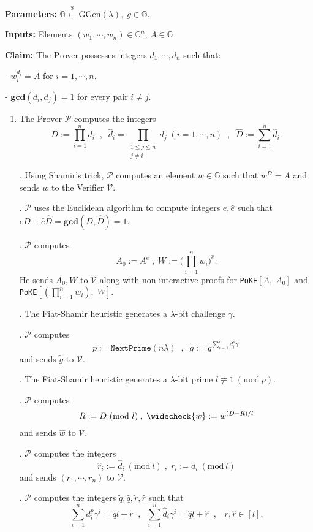 \documentclass[11pt, lettersize, notitlepage, leqno, footskip=0.6cm]{article}
\newcommand{\pl}{\prod\limits}
\newcommand{\slim}{\sum\limits}
\newcommand{\ttt}{\texttt}
\newcommand{\wti}{\widetilde}
\newcommand{\mc}{\mathcal}
\newcommand{\mb}{\mathbb}
\newcommand{\mbf}{\mathbf}
\newcommand{\mr}{\mathrm}
\newcommand{\lam}{\lambda}
\newcommand{\lamb}{\lambda}
\newcommand{\what}{\widehat}
\newcommand{\weck}{\widecheck}
\newcommand{\mP}{\mc{P}}
\newcommand{\V}{\mc{V}}
\newcommand{\vs}{\vspace{-0.15cm}}
\newcommand{\noin}{\noindent}
\newcommand{\Mod}[1]{\ (\mathrm{mod}\ #1)}
\newcommand{\GCD}{\mbf{gcd}}
\numberwithin{equation}{section}
\begin{document}
\noindent \textbf{Parameters:} $\mb{G}\xleftarrow{\$} \mr{GGen}(\lamb), \; g\in \mb{G}$.

\noindent \textbf{Inputs:} Elements $(w_1,\cdots, w_n)\in \mb{G}^n$, $A\in\mb{G}$

\noindent \textbf{Claim:} The Prover possesses integers $ d_1,\cdots, d_n$ such that:

\noindent - $w_i^{d_i} = A$ for $i = 1,\cdots,n$.

\noindent - $\GCD(d_i, d_j) = 1$ for every pair $i\neq j$.

\begin{enumerate}[wide, labelwidth=!, labelindent=0pt]\vs \item The Prover $\mc{P}$ computes the integers \vs $$D := \prod\limits_{i=1}^n d_i\;\;,\;\;\what{d}_i = \pl_{\substack{1\leq j\leq n\\ j\neq i}} d_j\;(i=1,\cdots,n)\;\;,\;\; \what{D}:=\slim_{i=1}^n\what{d}_i.$$ \vs

\noin 2. Using Shamir's trick, $\mc{P}$ computes an element $w\in\mb{G}$ such that $w^D = A$ and sends $w$ to the Verifier $\mc{V}$.

\noin 3. $\mP$ uses the Euclidean algorithm to compute integers $e,\what{e}$ such that $eD+\what{e}\what{D} = \GCD(D,\what{D}) = 1.$

\noin 4. $\mP$ computes $$A_0:= A^{e}\;,\;W := \big(\pl_{i=1}^n w_i\big)^{\what{e}}.$$ He sends $A_0,W$ to $\V$ along with non-interactive proofs for \verb|PoKE|$[A,\; A_0]$ and \verb|PoKE|$[(\pl_{i=1}^n w_i),\; W]$.

\noin 5. The Fiat-Shamir heuristic generates a $\lam$-bit challenge $\gamma$.

\noin 6. $\mc{P}$ computes \vs $$p:= \ttt{NextPrime}(n\lam)\;\;,\;\;\wti{g} := g^{\slim_{i=1}^n d_i^{p}\gamma^i}$$ and sends $\wti{g}$ to $\mc{V}$.

\noin 7. The Fiat-Shamir heuristic generates a $\lam$-bit prime $l\not\equiv 1\Mod{p}$.

\noin 8. $\mc{P}$ computes \vs $$R:= D\Mod{l}\;,\; \weck{w}:= w^{(D-R)/l}$$ and sends $\what{w}$ to $\mc{V}$.

\noin 9. $\mc{P}$ computes the integers \vs $$\what{r}_i:= \what{d}_i\Mod{l}\;,\;{r}_i:= {d}_i\Mod{l}$$ and sends $(r_1,\cdots,r_n)$ to $\mc{V}$.

\noin 10. $\mP$ computes the integers $\wti{q},\what{q}, \wti{r}, \what{r}$ such that \vs $$\slim_{i=1}^n {d}_i^{p}\gamma^i = \wti{q}l+\wti{r}\;\;,\;\; \slim_{i=1}^n \what{d}_i\gamma^i = \what{q}l+\what{r}\;\;,\;\;\;r,\what{r}\in [l].$$


\end{enumerate}
\end{document}
